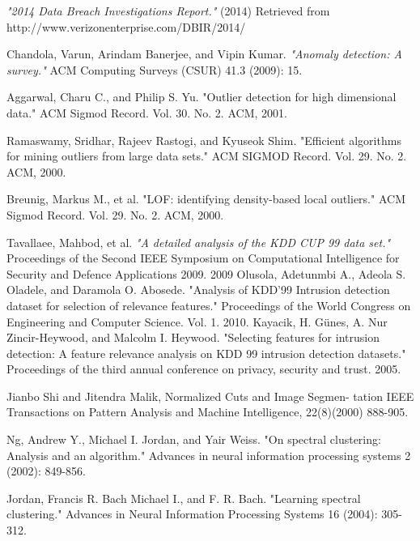 \begin{thebibliography}{9}

\emph{"2014 Data Breach Investigations Report."} (2014) Retrieved from http://www.verizonenterprise.com/DBIR/2014/

Chandola, Varun, Arindam Banerjee, and Vipin Kumar. \emph{"Anomaly detection: A survey."} ACM Computing Surveys (CSUR) 41.3 (2009): 15.

Aggarwal, Charu C., and Philip S. Yu. "Outlier detection for high dimensional data." ACM Sigmod Record. Vol. 30. No. 2. ACM, 2001.

Ramaswamy, Sridhar, Rajeev Rastogi, and Kyuseok Shim. "Efficient algorithms for mining outliers from large data sets." ACM SIGMOD Record. Vol. 29. No. 2. ACM, 2000.

Breunig, Markus M., et al. "LOF: identifying density-based local outliers." ACM Sigmod Record. Vol. 29. No. 2. ACM, 2000.

Tavallaee, Mahbod, et al. \emph{"A detailed analysis of the KDD CUP 99 data set."} Proceedings of the Second IEEE Symposium on Computational Intelligence for Security and Defence Applications 2009. 2009
Olusola, Adetunmbi A., Adeola S. Oladele, and Daramola O. Abosede. "Analysis of KDD’99 Intrusion detection dataset for selection of relevance features." Proceedings of the World Congress on Engineering and Computer Science. Vol. 1. 2010.
Kayacik, H. Günes, A. Nur Zincir-Heywood, and Malcolm I. Heywood. "Selecting features for intrusion detection: A feature relevance analysis on KDD 99 intrusion detection datasets." Proceedings of the third annual conference on privacy, security and trust. 2005.

Jianbo Shi and Jitendra Malik, Normalized Cuts and Image Segmen- tation IEEE Transactions on Pattern Analysis and Machine Intelligence, 22(8)(2000) 888-905.

Ng, Andrew Y., Michael I. Jordan, and Yair Weiss. "On spectral clustering: Analysis and an algorithm." Advances in neural information processing systems 2 (2002): 849-856.

Jordan, Francis R. Bach Michael I., and F. R. Bach. "Learning spectral clustering." Advances in Neural Information Processing Systems 16 (2004): 305-312.


\end{thebibliography}

